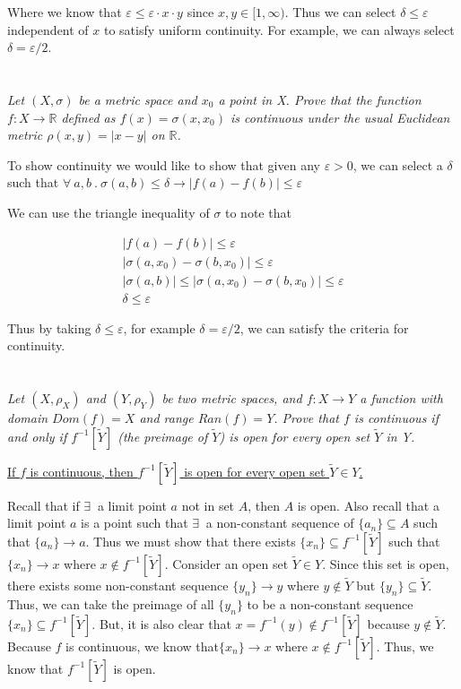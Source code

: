 \documentclass[]{article}
\newcommand{\reals}{\mathbb{R}}
\begin{document}
		Where we know that $\varepsilon \leq \varepsilon \cdot x \cdot y$ since $x, y \in [1, \infty)$. Thus we can select $\delta \leq \varepsilon$ independent of $x$ to satisfy uniform continuity. For example, we can always select $\delta = \varepsilon / 2$.

	\section{}
		\textit{Let $(X, \sigma)$ be a metric space and $x_0$ a point in X. Prove that the function $f : X \to \reals$ defined as $f(x) = \sigma(x, x_0)$ is continuous under the usual Euclidean metric $\rho(x, y) = |x - y|$ on $\reals$.}

		To show continuity we would like to show that given any $\varepsilon > 0$, we can select a $\delta$ such that $\forall\ a, b\ .\ \sigma(a, b) \leq \delta \to |f(a) - f(b)| \leq \varepsilon$

		We can use the triangle inequality of $\sigma$ to note that 

		\begin{align*}
			|f(a) - f(b)| \leq \varepsilon \\
			|\sigma(a, x_0) - \sigma(b, x_0)| \leq \varepsilon \\
			|\sigma(a, b)| \leq |\sigma(a, x_0) - \sigma(b, x_0)| \leq \varepsilon \\
			\delta \leq \varepsilon
		\end{align*}

		Thus by taking $\delta \leq \varepsilon$, for example $\delta = \varepsilon / 2$, we can satisfy the criteria for continuity. 

	\section{}
		\textit{Let $(X, \rho_X)$ and $(Y, \rho_Y)$ be two metric spaces, and $f : X \to Y$ a function with domain $Dom(f) = X$ and range $Ran(f) = Y$. Prove that $f$ is continuous if and only if $f^{-1}[\tilde{Y}]$ (the preimage of $\tilde{Y}$) is open for every open set $\tilde{Y}$ in Y.}

		\underline{If $f$ is continuous, then $f^{-1}[\tilde{Y}]$ is open for every open set $\tilde{Y} \in Y$.}

		Recall that if $\exists\ $ a limit point $a$ not in set $A$, then $A$ is open. Also recall that a limit point $a$ is a point such that $\exists\ $ a non-constant sequence of $\{a_n\} \subseteq A$ such that $\{a_n\} \to a$. Thus we must show that there exists $\{x_n\} \subseteq f^{-1}[\tilde{Y}]$ such that $\{x_n\} \to x$ where $x \notin f^{-1}[\tilde{Y}]$. Consider an open set $\tilde{Y} \in Y$. Since this set is open, there exists some non-constant sequence $\{y_n\} \to y$ where $y \notin \tilde{Y}$ but $\{y_n\} \subseteq \tilde{Y}$. Thus, we can take the preimage of all $\{y_n\}$ to be a non-constant sequence $\{x_n\} \subseteq f^{-1}[\tilde{Y}]$. But, it is also clear that $x = f^{-1}(y) \notin f^{-1}[\tilde{Y}]$ because $y \notin \tilde{Y}$. Because $f$ is continuous, we know that$\{x_n\} \to x$ where $x \notin f^{-1}[\tilde{Y}]$. Thus, we know that $f^{-1}[\tilde{Y}]$ is open. 
\end{document}
